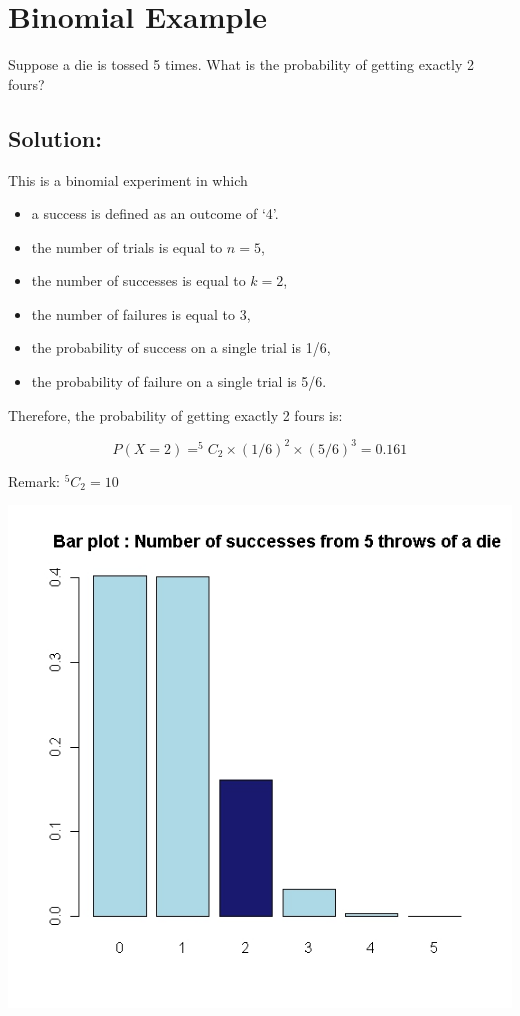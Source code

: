 \documentclass[a4paper,12pt]{article}
\begin{document}
\section*{Binomial Example }

Suppose a die is tossed 5 times. What is the probability of getting exactly 2 fours?

\subsection*{Solution:}

This is a binomial experiment in which \begin{itemize}\item a success is defined as an outcome of `4'. \item the number of trials is equal to $n=5$, \item the number of successes is equal to $k=2$,\item the number of failures is equal to 3, \item  the probability of success on a single trial is 1/6, \item  the probability of failure on a single trial is 5/6.\end{itemize}

\smallskip

Therefore, the probability of getting exactly 2 fours is:

\[P(X=2) = ^5C_2 \times (1/6)^2 \times (5/6)^3 = 0.161\]

Remark: $^5C_2 = 10$\\
\bigskip

\begin{center}
\includegraphics[scale=0.40]{images/3Bbarplot4}
\end{center}
\end{document}
